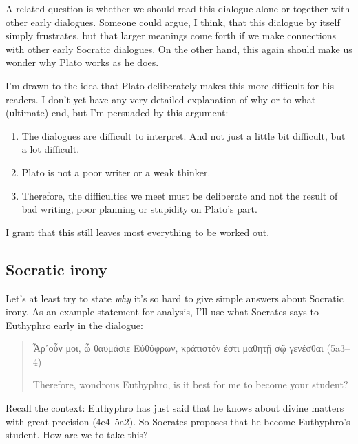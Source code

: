 \documentclass[12pt]{article}
\begin{document}
A related question is whether we should read this dialogue alone or together
with other early dialogues.  Someone could argue, I think, that this dialogue
by itself simply frustrates, but that larger meanings come forth if we make
connections with other early Socratic dialogues.  On the other hand, this again
should make us wonder why Plato works as he does.

I'm drawn to the idea that Plato deliberately makes this more difficult for his
readers.  I don't yet have any very detailed explanation of why or to what
(ultimate) end, but I'm persuaded by this argument:

\begin{enumerate}

    \item The dialogues are difficult to interpret.  And not just a little bit
        difficult, but a lot difficult.

    \item Plato is not a poor writer or a weak thinker.

    \item Therefore, the difficulties we meet must be deliberate and not the
        result of bad writing, poor planning or stupidity on Plato's part.

\end{enumerate}

I grant that this still leaves most everything to be worked out.


\subsection{Socratic irony}

Let's at least try to state \emph{why} it's so hard to give simple answers
about Socratic irony.  As an example statement for analysis, I'll use what
Socrates says to Euthyphro early in the dialogue:

\begin{quote}

    {\g Ἆρ᾽οὖν μοι, ὦ θαυμάσιε Εὐθύφρων, κράτιστόν ἐστι μαθητῇ σῷ γενέσθαι}
    (5a3--4)

    Therefore, wondrous Euthyphro, is it best for me to become your student?

\end{quote}

Recall the context: Euthyphro has just said that he knows about divine matters
with great precision (4e4--5a2).  So Socrates proposes that he become
Euthyphro's student.  How are we to take this?
\end{document}
